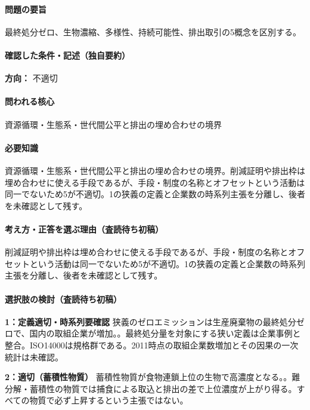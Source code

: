 \paragraph{問題の要旨} 最終処分ゼロ、生物濃縮、多様性、持続可能性、排出取引の5概念を区別する。

\paragraph{確認した条件・記述（独自要約）}\mbox{}\par

\noindent\textbf{方向：} 不適切\par

\paragraph{問われる核心} 資源循環・生態系・世代間公平と排出の埋め合わせの境界

\paragraph{必要知識} 資源循環・生態系・世代間公平と排出の埋め合わせの境界。削減証明や排出枠は埋め合わせに使える手段であるが、手段・制度の名称とオフセットという活動は同一でないため5が不適切。1の狭義の定義と企業数の時系列主張を分離し、後者を未確認として残す。

\paragraph{考え方・正答を選ぶ理由（査読待ち初稿）} 削減証明や排出枠は埋め合わせに使える手段であるが、手段・制度の名称とオフセットという活動は同一でないため5が不適切。1の狭義の定義と企業数の時系列主張を分離し、後者を未確認として残す。

\paragraph{選択肢の検討（査読待ち初稿）}\mbox{}\par

\noindent\textbf{1：定義適切・時系列要確認} 狭義のゼロエミッションは生産廃棄物の最終処分ゼロで、国内の取組企業が増加。。最終処分量を対象にする狭い定義は企業事例と整合。ISO14000は規格群である。2011時点の取組企業数増加とその因果の一次統計は未確認。\par

\noindent\textbf{2：適切（蓄積性物質）} 蓄積性物質が食物連鎖上位の生物で高濃度となる。。難分解・蓄積性の物質では捕食による取込と排出の差で上位濃度が上がり得る。すべての物質で必ず上昇するという主張ではない。\par


